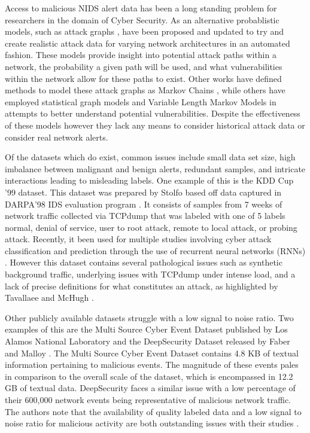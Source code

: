 Access to malicious NIDS alert data has been a long standing problem for researchers in the domain of Cyber Security. As an alternative probablistic models, such as attack graphs \cite{Qin2004, Wang2006, Noel2009}, have been proposed and updated to try and create realistic attack data for varying network architectures in an automated fashion. These models provide insight into potential attack paths within a network, the probability a given path will be used, and what vulnerabilities within the network allow for these paths to exist. Other works have defined methods to model these attack graphs as Markov Chains \cite{Li2017}, while others have employed statistical graph models \cite{Du2014} and Variable Length Markov Models \cite{Fava2008} in attempts to better understand potential vulnerabilities. Despite the effectiveness of these models however they lack any means to consider historical attack data or consider real network alerts. 

Of the datasets which do exist, common issues include small data set size, high imbalance between malignant and benign alerts, redundant samples, and intricate interactions leading to misleading labels. One example of this is the KDD Cup '99 \cite{kdd-cup} dataset. This dataset was prepared by Stolfo \etal \cite{Stolfo} based off data captured in DARPA'98 IDS evaluation program \cite{Lippmann}. It consists of samples from 7 weeks of network traffic collected via TCPdump that was labeled with one of 5 labels {normal, denial of service, user to root attack, remote to local attack, or probing attack}. Recently, it been used for multiple studies involving cyber attack classification and prediction through the use of recurrent neural networks (RNNs) \cite{Kim, Staudemeyer}. However this dataset contains several pathological issues such as synthetic background traffic, underlying issues with TCPdump under intense load, and a lack of precise definitions for what constitutes an attack, as highlighted by Tavallaee \etal \cite{Tavallaee} and McHugh \cite{McHugh}.

Other publicly available datasets struggle with a low signal to noise ratio. Two examples of this are the Multi Source Cyber Event Dataset published by Los Alamos National Laboratory \cite{akent-2015-enterprise-data} and the DeepSecurity Dataset released by Faber and Malloy \cite{Faber2018}. The Multi Source Cyber Event Dataset contains 4.8 KB of textual information pertaining to malicious events. The magnitude of these events pales in comparison to the overall scale of the dataset, which is encompassed in 12.2 GB of textual data. DeepSecurity faces a similar issue with a low percentage of their 600,000 network events being representative of malicious network traffic. The authors note that the availability of quality labeled data and a low signal to noise ratio for malicious activity are both outstanding issues with their studies \cite{Faber2018}. 

